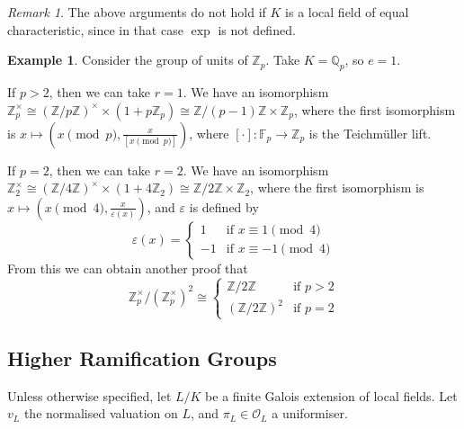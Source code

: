 \documentclass[11pt]{article}
\theoremstyle{definition}
\newtheorem*{example}{Example}
\theoremstyle{plain}
\theoremstyle{remark}
\newtheorem*{remark}{Remark}
\newcommand{\FF}{\mathbb{F}}
\newcommand{\ZZ}{\mathbb{Z}}
\newcommand{\QQ}{\mathbb{Q}}
\newcommand{\cO}{\mathcal{O}}
\begin{document}
\begin{remark}
    The above arguments do not hold if $K$ is a local field of equal characteristic, since in that case $\exp$ is not defined.
\end{remark}

\begin{example}
    Consider the group of units of $\ZZ_p$. Take $K = \QQ_p$, so $e = 1$.

    If $p > 2$, then we can take $r = 1$.
    We have an isomorphism $\ZZ_p^\times \cong (\ZZ / p \ZZ)^\times \times (1 + p \ZZ_p) \cong \ZZ / (p-1) \ZZ \times \ZZ_p$, where the first isomorphism is $x \mapsto (x \pmod{p}, \frac{x}{[x \pmod{p}]})$, where $[\cdot] : \FF_p \to \ZZ_p$ is the Teichm\"uller lift.

    If $p = 2$, then we can take $r = 2$. We have an isomorphism $\ZZ_2^\times \cong (\ZZ / 4 \ZZ)^\times \times (1 + 4 \ZZ_2) \cong \ZZ / 2 \ZZ \times \ZZ_2$, where the first isomorphism is $x \mapsto (x \pmod{4}, \frac{x}{\varepsilon(x)})$, and $\varepsilon$ is defined by
    \begin{equation*}
        \varepsilon(x) = \begin{cases}
            1 & \text{if } x \equiv 1 \pmod{4}\\
            -1 & \text{if } x \equiv -1 \pmod{4}
        \end{cases}
    \end{equation*}
    From this we can obtain another proof that
    \begin{equation*}
        \ZZ_p^\times / (\ZZ_p^\times)^2 \cong
        \begin{cases}
            \ZZ / 2 \ZZ & \text{if } p > 2\\
            (\ZZ / 2 \ZZ)^2 & \text{if } p = 2
        \end{cases}
    \end{equation*}
\end{example}

\subsection{Higher Ramification Groups}

Unless otherwise specified, let $L / K$ be a finite Galois extension of local fields. Let $v_L$ the normalised valuation on $L$, and $\pi_L \in \cO_L$ a uniformiser.
\end{document}
